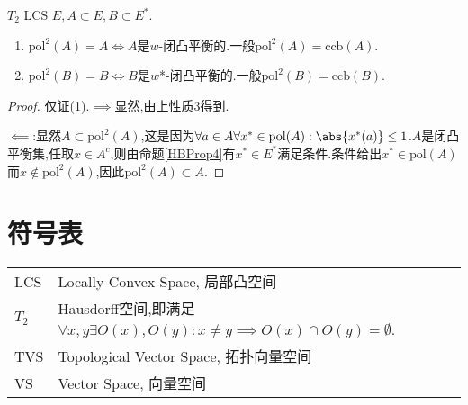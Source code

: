 \documentclass{article}
\begin{document}
\begin{theorem}[双极定理]
    $T_2$ LCS $E, A\subset E,B\subset E^*$.
    \begin{enumerate}
        \item $\mathrm{pol}^2(A)=A\iff A$是$w$-闭凸平衡的.一般$\mathrm{pol}^2(A)=\mathrm{ccb}(A)$.
        \item $\mathrm{pol}^2(B)=B\iff B$是$w$*-闭凸平衡的.一般$\mathrm{pol}^2(B)=\mathrm{ccb}(B)$.
    \end{enumerate}
\end{theorem}
\begin{proof}
    仅证(1).$\implies$显然,由上性质3得到.

    $\impliedby$:显然$A\subset \mathrm{pol}^2(A)$,这是因为$\forall a\in A\forall x^*\in \mathrm{pol}(A):\abs{x^*(a)}\leq 1$.$A$是闭凸平衡集,任取$x\in A^c$,则由命题\ref{HBProp4}有$x^*\in E^*$满足条件.条件给出$x^*\in \mathrm{pol}(A)$而$x\notin \mathrm{pol}^2(A)$,因此$\mathrm{pol}^2(A)\subset A$.
\end{proof}

\section{符号表}
\begin{tabular}{ll}
    LCS&Locally Convex Space, 局部凸空间\\
    $T_2$&Hausdorff空间,即满足$\forall x,y\exists O(x),O(y):x\neq y\implies O(x)\cap O(y)=\emptyset$.\\
    TVS&Topological Vector Space, 拓扑向量空间\\
    VS&Vector Space, 向量空间
\end{tabular}
\end{document}
